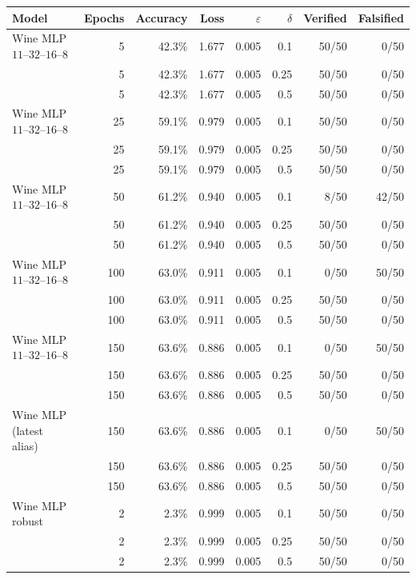 \documentclass[11pt,a4paper]{article}
\begin{document}
\begin{center}
  \small
  \begin{tabular}{lrrrrrrr}
    \toprule
    Model & Epochs & Accuracy & Loss & $\varepsilon$ & $\delta$ & Verified & Falsified \\
    \midrule
    Wine MLP $11$--$32$--$16$--$8$ & 5 & 42.3\% & 1.677 & 0.005 & 0.1 & 50/50 & 0/50 \\
             & 5 & 42.3\% & 1.677 & 0.005 & 0.25 & 50/50 & 0/50 \\
             & 5 & 42.3\% & 1.677 & 0.005 & 0.5 & 50/50 & 0/50 \\
    Wine MLP $11$--$32$--$16$--$8$ & 25 & 59.1\% & 0.979 & 0.005 & 0.1 & 50/50 & 0/50 \\
             & 25 & 59.1\% & 0.979 & 0.005 & 0.25 & 50/50 & 0/50 \\
             & 25 & 59.1\% & 0.979 & 0.005 & 0.5 & 50/50 & 0/50 \\
    Wine MLP $11$--$32$--$16$--$8$ & 50 & 61.2\% & 0.940 & 0.005 & 0.1 & 8/50 & 42/50 \\
             & 50 & 61.2\% & 0.940 & 0.005 & 0.25 & 50/50 & 0/50 \\
             & 50 & 61.2\% & 0.940 & 0.005 & 0.5 & 50/50 & 0/50 \\
    Wine MLP $11$--$32$--$16$--$8$ & 100 & 63.0\% & 0.911 & 0.005 & 0.1 & 0/50 & 50/50 \\
             & 100 & 63.0\% & 0.911 & 0.005 & 0.25 & 50/50 & 0/50 \\
             & 100 & 63.0\% & 0.911 & 0.005 & 0.5 & 50/50 & 0/50 \\
    Wine MLP $11$--$32$--$16$--$8$ & 150 & 63.6\% & 0.886 & 0.005 & 0.1 & 0/50 & 50/50 \\
             & 150 & 63.6\% & 0.886 & 0.005 & 0.25 & 50/50 & 0/50 \\
             & 150 & 63.6\% & 0.886 & 0.005 & 0.5 & 50/50 & 0/50 \\
    Wine MLP (latest alias) & 150 & 63.6\% & 0.886 & 0.005 & 0.1 & 0/50 & 50/50 \\
             & 150 & 63.6\% & 0.886 & 0.005 & 0.25 & 50/50 & 0/50 \\
             & 150 & 63.6\% & 0.886 & 0.005 & 0.5 & 50/50 & 0/50 \\
    Wine MLP robust & 2 & 2.3\% & 0.999 & 0.005 & 0.1 & 50/50 & 0/50 \\
             & 2 & 2.3\% & 0.999 & 0.005 & 0.25 & 50/50 & 0/50 \\
             & 2 & 2.3\% & 0.999 & 0.005 & 0.5 & 50/50 & 0/50 \\

\end{tabular}
\end{center}
\end{document}
